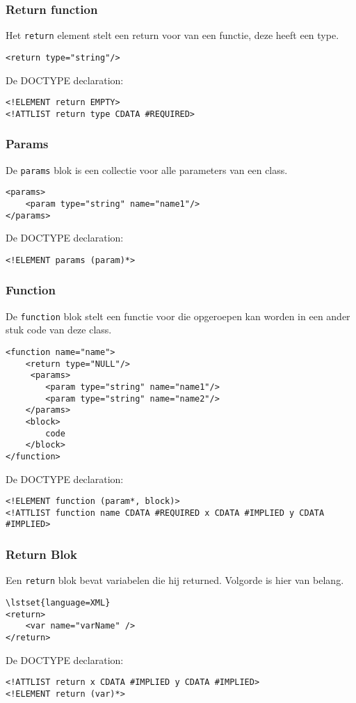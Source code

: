 \documentclass[]{article}
\begin{document}
\subsubsection{Return function}
Het \texttt{return} element stelt een return voor van een functie, deze heeft een type. 
\lstset{language=XML}
\begin{lstlisting}
<return type="string"/>
\end{lstlisting}
De DOCTYPE declaration: 
\lstset{language=XML}
\begin{lstlisting}
<!ELEMENT return EMPTY>
<!ATTLIST return type CDATA #REQUIRED>
\end{lstlisting}

\subsubsection{Params}
De \texttt{params} blok is een collectie voor alle parameters van een class.
\lstset{language=XML}
\begin{lstlisting}
<params>
	<param type="string" name="name1"/>
</params>
\end{lstlisting}
De DOCTYPE declaration: 
\lstset{language=XML}
\begin{lstlisting}
<!ELEMENT params (param)*>
\end{lstlisting}

\subsubsection{Function}
De \texttt{function} blok stelt een functie voor die opgeroepen kan worden in een ander stuk code van deze class. 
\lstset{language=XML}
\begin{lstlisting}
<function name="name">
    <return type="NULL"/>     
     <params>
	    <param type="string" name="name1"/>
	    <param type="string" name="name2"/>
    </params>
	<block>
		code
	</block>
</function>
\end{lstlisting}
De DOCTYPE declaration: 
\lstset{language=XML}
\begin{lstlisting}
<!ELEMENT function (param*, block)>
<!ATTLIST function name CDATA #REQUIRED x CDATA #IMPLIED y CDATA #IMPLIED>
\end{lstlisting}
\subsubsection{Return Blok}
Een \texttt{return} blok bevat variabelen die hij returned. Volgorde is hier van belang.
\begin{lstlisting}
\lstset{language=XML}
<return>
	<var name="varName" />
</return>	
\end{lstlisting}
De DOCTYPE declaration: 
\lstset{language=XML}
\begin{lstlisting}
<!ATTLIST return x CDATA #IMPLIED y CDATA #IMPLIED>
<!ELEMENT return (var)*>
\end{lstlisting}
\end{document}
